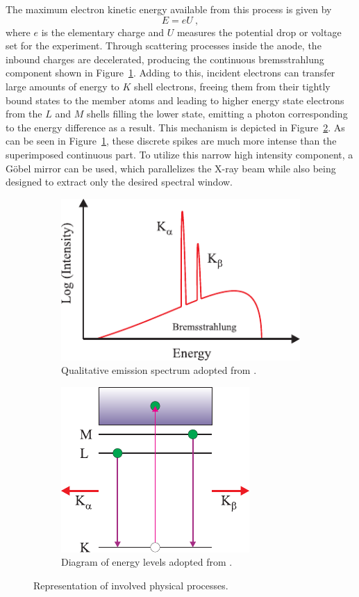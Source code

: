 The maximum electron kinetic energy available from this process is given by
\begin{equation*}
	E = e U \: ,
\end{equation*}
where $e$ is the elementary charge and $U$ measures the potential drop or voltage set for the experiment.
Through scattering processes inside the anode, the inbound charges are decelerated, producing the continuous bremsstrahlung component
shown in Figure~\ref{fig:spectrum}. Adding to this, incident electrons can transfer large amounts of energy to $K$ shell electrons,
freeing them from their tightly bound states to the member atoms and leading to higher energy state electrons from the $L$ and $M$
shells filling the lower state, emitting a photon corresponding to the energy difference as a result. This mechanism is depicted
in Figure~\ref{fig:levels}. As can be seen in Figure~\ref{fig:spectrum}, these discrete spikes are much more intense than the superimposed
continuous part. To utilize this narrow high intensity component, a Göbel mirror can be used, which parallelizes the X-ray beam while also
being designed to extract only the desired spectral window.

\begin{figure}[H]
	\begin{subfigure}{0.5\textwidth}
		\centering
		\includegraphics{content/graphics/XraySpectrum.pdf}
		\caption{Qualitative emission spectrum adopted from \cite{McMorrow_2011_2}.}
		\label{fig:spectrum}
	\end{subfigure}
	\hfill
	\begin{subfigure}{0.5\textwidth}
		\centering
		\includegraphics{content/graphics/LevelDiagram.pdf}
		\caption{Diagram of energy levels adopted from \cite{McMorrow_2011_2}.}
		\label{fig:levels}
	\end{subfigure}
	\caption{Representation of involved physical processes.}
	\label{fig:process}
\end{figure}


